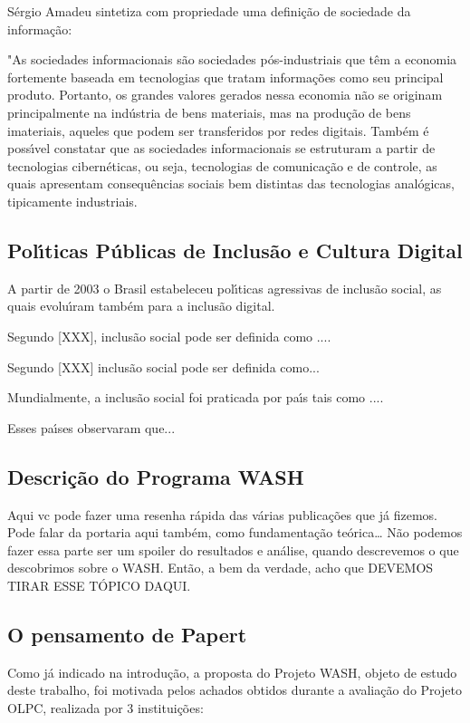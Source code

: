 \documentclass[
12pt,		%
openright,	%
twoside,  %
a4paper,			%
chapter=TITLE,		%
english,			%
french,				%
spanish,			%
brazil				%
]{USPSC-classe/USPSC}
\begin{document}
S\'ergio Amadeu sintetiza com propriedade uma defini\c{c}\~ao de sociedade da informa\c{c}\~ao: 


"As sociedades informacionais s\~ao sociedades p\'os-industriais que t\^em a economia fortemente baseada em tecnologias que tratam informa\c{c}\~oes como seu principal produto. Portanto, os grandes valores gerados nessa economia n\~ao se originam principalmente na ind\'ustria de bens materiais, mas na produ\c{c}\~ao de bens imateriais, aqueles que podem ser transferidos por redes digitais. Tamb\'em \'e poss\'{\i}vel constatar que as sociedades informacionais se estruturam a partir de tecnologias cibern\'eticas, ou seja, tecnologias de comunica\c{c}\~ao e de controle, as quais apresentam consequ\^encias sociais bem distintas das tecnologias anal\'ogicas, tipicamente industriais.
\subsection[Pol\'{\i}ticas P\'ublicas de Inclus\~ao e Cultura Digital]{Pol\'{\i}ticas P\'ublicas de Inclus\~ao e Cultura Digital}\label{Pol\'{\i}ticas P\'ublicas de Inclus\~ao e Cultura Digital}
A partir de 2003 o Brasil estabeleceu pol\'{\i}ticas agressivas de inclus\~ao social, as quais evolu\'{\i}ram tamb\'em para a inclus\~ao digital.


Segundo [XXX], inclus\~ao social pode ser definida como ....


Segundo [XXX] inclus\~ao social pode ser definida como...


Mundialmente, a inclus\~ao social foi praticada por pa\'{\i}s tais como ....


Esses pa\'{\i}ses observaram que...


\subsection[Descri\c{c}\~ao do Programa WASH]{Descri\c{c}\~ao do Programa WASH}\label{Descri\c{c}\~ao do Programa WASH}
Aqui vc pode fazer uma resenha r\'apida das v\'arias publica\c{c}\~oes que j\'a fizemos. Pode falar da portaria aqui tamb\'em, como fundamenta\c{c}\~ao te\'orica… N\~ao podemos fazer essa parte ser um spoiler do resultados e an\'alise, quando descrevemos o que descobrimos sobre o WASH. Ent\~ao, a bem da verdade, acho que DEVEMOS TIRAR ESSE T\'OPICO DAQUI.


\subsection[O pensamento de Papert]{O pensamento de Papert}\label{O pensamento de Papert}
Como j\'a indicado na introdu\c{c}\~ao, a proposta do Projeto WASH, objeto de estudo deste trabalho, foi motivada pelos achados obtidos durante a avalia\c{c}\~ao do Projeto OLPC, realizada por 3 institui\c{c}\~oes:
\end{document}
